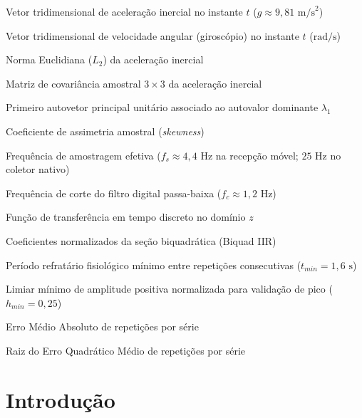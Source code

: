 \documentclass[12pt,openany,oneside,a4paper,english,brazil]{abntex2}
\begin{document}
\begin{simbolos}
  \item[$\mathbf{a}(t)$] Vetor tridimensional de aceleração inercial no instante $t$ ($g \approx 9{,}81\text{ m/s}^2$)
  \item[$\boldsymbol{\omega}(t)$] Vetor tridimensional de velocidade angular (giroscópio) no instante $t$ ($\text{rad/s}$)
  \item[$\|\mathbf{a}(t)\|_2$] Norma Euclidiana ($L_2$) da aceleração inercial
  \item[$\mathbf{C}$] Matriz de covariância amostral $3 \times 3$ da aceleração inercial
  \item[$\mathbf{v}_1$] Primeiro autovetor principal unitário associado ao autovalor dominante $\lambda_1$
  \item[$\gamma_1$] Coeficiente de assimetria amostral (\textit{skewness})
  \item[$f_s$] Frequência de amostragem efetiva ($f_s \approx 4{,}4\text{ Hz}$ na recepção móvel; $25\text{ Hz}$ no coletor nativo)
  \item[$f_c$] Frequência de corte do filtro digital passa-baixa ($f_c \approx 1{,}2\text{ Hz}$)
  \item[$H(z)$] Função de transferência em tempo discreto no domínio $z$
  \item[$b_0, b_1, b_2, a_1, a_2$] Coeficientes normalizados da seção biquadrática (Biquad IIR)
  \item[$t_{min}$] Período refratário fisiológico mínimo entre repetições consecutivas ($t_{min} = 1{,}6\text{ s}$)
  \item[$h_{min}$] Limiar mínimo de amplitude positiva normalizada para validação de pico ($h_{min} = 0{,}25$)
  \item[$MAE$] Erro Médio Absoluto de repetições por série
  \item[$RMSE$] Raiz do Erro Quadrático Médio de repetições por série
\end{simbolos}

\tableofcontents*
\cleardoublepage

\textual

\chapter{Introdução}
\end{document}
